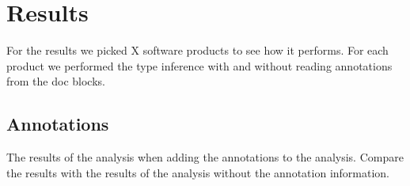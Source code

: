 \documentclass[main.tex]{subfiles}
\begin{document}
    \chapter{Results}\label{chap:results}
    For the results we picked X software products to see how it performs.
    For each product we performed the type inference with and without reading annotations from the doc blocks.
    
    \section{Annotations}
    The results of the analysis when adding the annotations to the analysis. Compare the results with the results of the analysis without the annotation information.
    
\end{document}

